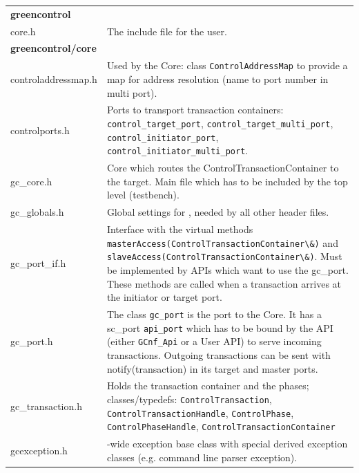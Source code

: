 \noindent
\begin{minipage}{\textwidth}
\begin{tabularx}{\textwidth}{|l|X|}
	\cline{1-1}\cline{2-2}\multicolumn{2}{|l|}{ {\bf greencontrol}    }\\ 
	\cline{1-1}\cline{2-2} core.h    &  The include file for the user. \\ 
	\cline{1-1}\cline{2-2}\multicolumn{2}{|l|}{  {\bf greencontrol/core}    }\\ 
	\cline{1-1}\cline{2-2} controladdressmap.h    &  Used by the Core: class \lstinline|ControlAddressMap| to provide a map for address resolution (name to port number in multi port).   \\ 
	\cline{1-1}\cline{2-2} controlports.h    &  Ports to transport transaction containers: \mbox{\lstinline|control_target_port|,} \mbox{\lstinline|control_target_multi_port|,} \mbox{\lstinline|control_initiator_port|}, \mbox{\lstinline|control_initiator_multi_port|.}   \\ 
	\cline{1-1}\cline{2-2} gc\_core.h    &  \GreenControl Core which routes the ControlTransactionContainer to the target. Main file which has to be included by the top level (testbench). \\ 
	\cline{1-1}\cline{2-2} gc\_globals.h    &  Global settings for \GreenControl, needed by all other header files. \\ 
	\cline{1-1}\cline{2-2} gc\_port\_if.h    &  Interface with the virtual methods \lstinline|masterAccess(ControlTransactionContainer\&)| and \lstinline|slaveAccess(ControlTransactionContainer\&)|. Must be implemented by APIs which want to use the gc\_port. These methods are called when a transaction arrives at the initiator or target port.   \\ 
	\cline{1-1}\cline{2-2} gc\_port.h    &  The class \lstinline|gc_port| is the port to the \GreenControl Core. It has a sc\_port \lstinline|api_port| which has to be bound by the API (either \lstinline|GCnf_Api| or a User API) to serve incoming transactions. Outgoing transactions can be sent with notify(transaction) in its target and master ports.   \\ 
	\cline{1-1}\cline{2-2} gc\_transaction.h    &  Holds the transaction container and the phases; classes/typedefs: \lstinline|ControlTransaction|, \lstinline|ControlTransactionHandle|, \lstinline|ControlPhase|,  \lstinline|ControlPhaseHandle|, \lstinline|ControlTransactionContainer|   \\ %
	\cline{1-1}\cline{2-2} gcexception.h    &  \GreenControl-wide exception base class with special derived exception classes (e.g. command line parser exception).   \\ 

\end{tabularx}
\end{minipage}
